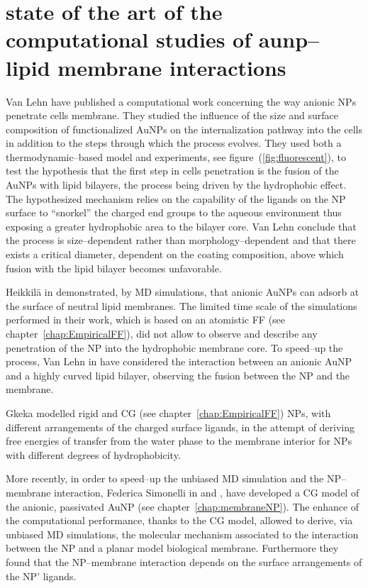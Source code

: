 \section{state of the art of the computational studies of aunp--lipid membrane interactions}
Van Lehn \etal have published a computational work \cite{VanLehn2013} concerning the way anionic \acp{NP} penetrate cells membrane. They studied the influence of the size and surface composition of functionalized \acp{AuNP} on the internalization pathway into the cells in addition to the steps through which the process evolves. They used both a thermodynamic--based model and experiments, see figure~(\ref{fig:fluorescent}), to test the hypothesis that the first step in cells penetration is the fusion of the \acp{AuNP} with lipid bilayers, the process being driven by the hydrophobic effect. The hypothesized mechanism relies on the capability of the ligands on the \ac{NP} surface to ``snorkel'' the charged end groups to the aqueous environment thus exposing a greater hydrophobic area to the bilayer core. Van Lehn \etal conclude that the process is size--dependent rather than morphology--dependent and that there exists a critical diameter, dependent on the coating composition, above which fusion with the lipid bilayer becomes unfavorable.

Heikkilä \etal in \cite{Heikkila2014} demonstrated, by \ac{MD} simulations, that anionic \acp{AuNP} can adsorb at the surface of neutral lipid membranes. The limited time scale of the simulations performed in their work, which is based on an atomistic \ac{FF} (see chapter~\ref{chap:EmpiricalFF}), did not allow to observe and describe any penetration of the \ac{NP} into the hydrophobic membrane core. To speed--up the process, Van Lehn \etal in \cite{VanLehn2014} have considered the interaction between an anionic \ac{AuNP} and a highly curved lipid bilayer, observing the fusion between the \ac{NP} and the membrane.

Gkeka \etal modelled rigid \cite{Gkeka2013} and \ac{CG} \cite{Gkeka2014} (see chapter~\ref{chap:EmpiricalFF}) \acp{NP}, with different arrangements of the charged surface ligands, in the attempt of deriving free energies of transfer from the water phase to the membrane interior for \acp{NP} with different degrees of hydrophobicity.

More recently, in order to speed--up the unbiased \ac{MD} simulation and the \ac{NP}--membrane interaction, Federica Simonelli \etal in \cite{simonelliThesis} and \cite{ourPaper}, have developed a \ac{CG} model of the anionic, passivated \ac{AuNP} (see chapter~\ref{chap:membraneNP}). The enhance of the computational performance, thanks to the \ac{CG} model, allowed to derive, via unbiased \ac{MD} simulations, the molecular mechanism associated to the interaction between the \ac{NP} and a planar model biological membrane. Furthermore they found that the \ac{NP}--membrane interaction depends on the surface arrangements of the \ac{NP}' ligands. 

